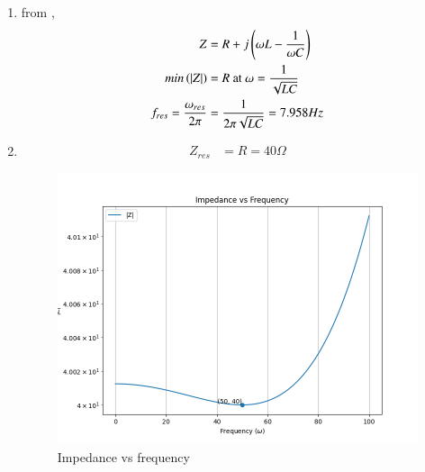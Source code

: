 \documentclass[journal,12pt,twocolumn]{IEEEtran}
\begin{document}
\begin{enumerate}
\item 
from ,
\begin{align}
    Z & = R + j\left(\omega L - \frac{1}{\omega C}\right)\\
    min\left(|Z|\right) & = R \text{ at } \omega = \frac{1}{\sqrt{LC}}\\ 
    f_{res} = \frac{\omega_{res}}{2\pi} & = \frac{1}{2\pi\sqrt{LC}} = 7.958 Hz \label{217.eq.3}
\end{align}
\item 
\begin{align}
    Z_{res} & = R = 40 \Omega\label{217.eq.4}
\end{align}

\begin{figure}[h]
     \centering
	\includegraphics[width=\columnwidth]{figs/impedance.png}
     \caption{Impedance vs frequency}
     \label{217.fig.3}
\end{figure}


\end{enumerate}
\end{document}

